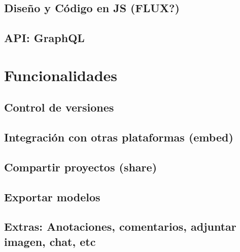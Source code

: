 \subsection{Diseño y Código en JS (FLUX?)}

\subsection{API: GraphQL}


\section{Funcionalidades}

\subsection{Control de versiones}

\subsection{Integración con otras plataformas (embed)}

\subsection{Compartir proyectos (share)}

\subsection{Exportar modelos}

\subsection{Extras: Anotaciones, comentarios, adjuntar imagen, chat, etc}
